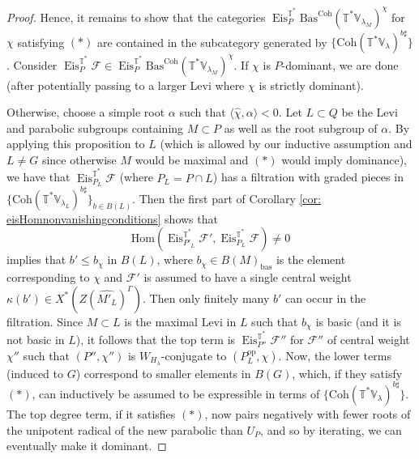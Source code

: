 \documentclass{amsart}
\theoremstyle{definition}
\theoremstyle{remark}
\numberwithin{equation}{section}
\newcommand{\mc}{\mathcal}
\newcommand{\bas}{\mathrm{bas}}
\newcommand{\Hom}{\mathrm{Hom}}
\newcommand{\op}{\mathrm{op}}
\newcommand{\wh}{\widehat}
\DeclareMathOperator{\Eis}{\mathrm{Eis}}
\newcommand{\Coh}{\mathrm{Coh}}
\newcommand{\V}{\mathbb{V}}
\newcommand{\T}{\mathbb{T}}
\newcommand{\Bas}{\mathrm{Bas}}
\begin{document}
\begin{proof}
Hence, it remains to show that the categories $\Eis^{\T^{\ast}}_P \Bas^\Coh(\T^{\ast}\V_{\lambda_M})^{\chi}$ for $\chi$ satisfying $(\bm{\ast})$ are contained in the subcategory generated by $\{\Coh(\T^{\ast}\V_{\lambda})^{b\sharp}\}$. Consider $\Eis^{\T^{\ast}}_P\mc{F} \in \Eis^{\T^{\ast}}_P \Bas^\Coh(\T^{\ast}\V_{\lambda_M})^{\chi}$. If $\chi$ is $P$-dominant, we are done (after potentially passing to a larger Levi where $\chi$ is strictly dominant).

Otherwise, choose a simple root $\alpha$ such that $\langle \wh{\chi}, \alpha \rangle < 0$. Let $L \subset Q$ be the Levi and parabolic subgroups containing $M \subset P$ as well as the root subgroup of $\alpha$. By applying this proposition to $L$ (which is allowed by our inductive assumption and $L \neq G$ since otherwise $M$ would be maximal and $(\bm{\ast})$ would imply dominance), we have that $\Eis^{\T^{\ast}}_{P_L} \mc{F}$ (where $P_L  = P \cap L$) has a filtration with graded pieces in $\{\Coh(\T^{\ast}\V_{\lambda_L})^{b\sharp}\}_{b \in B(L)}$. Then the first part of Corollary \ref{cor: eisHomnonvanishingconditions} shows that
\begin{equation*}
    \Hom(\Eis^{\T^{\ast}}_{P'_L} \mc{F}', \Eis^{\T^{\ast}}_{P_L} \mc{F}) \neq 0
\end{equation*}
implies that $b' \leq b_{\chi}$ in $B(L)$, where $b_{\chi} \in B(M)_{\bas}$ is the element corresponding to $\chi$ and $\mc{F}'$ is assumed to have a single central weight $\kappa(b') \in X^{\ast}(Z(\wh{M'_L})^{\Gamma})$. Then only finitely many $b'$ can occur in the filtration. Since $M \subset L$ is the maximal Levi in $L$ such that $b_\chi$ is basic (and it is not basic in $L$), it follows that the top term is $\Eis^{\T^{\ast}}_{P''} \mc{F}''$ for $\mc{F}''$ of central weight $\chi''$ such that $(P'', \chi'')$ is $W_{H_\lambda}$-conjugate to $(P^{\op}_L, \chi)$. Now, the lower terms (induced to $G$) correspond to smaller elements in $B(G)$, which, if they satisfy $(\bm{\ast})$, can inductively be assumed to be expressible in terms of $\{\Coh(\T^{\ast}\V_{\lambda})^{b\sharp}\}$. The top degree term, if it satisfies $(\bm{\ast})$, now pairs negatively with fewer roots of the unipotent radical of the new parabolic than $U_P$, and so by iterating, we can eventually make it dominant. 


\end{proof}
\end{document}
